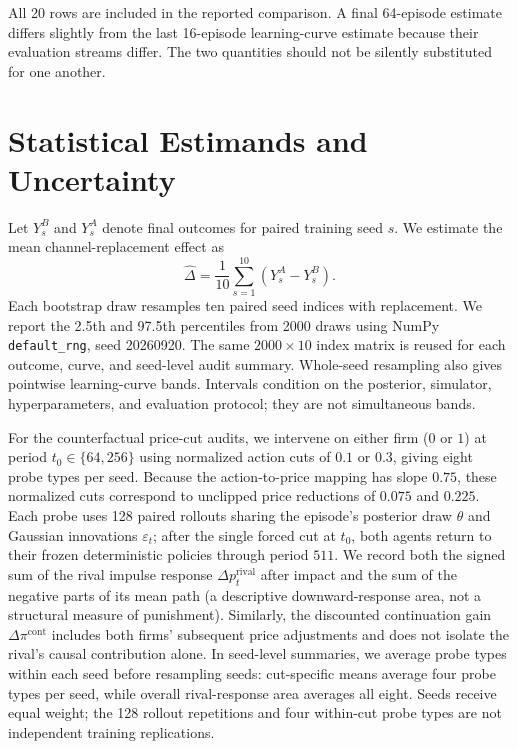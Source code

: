 \documentclass{article}
\begin{document}
All 20 rows are included in the reported comparison. A final 64-episode estimate differs slightly from the last 16-episode learning-curve estimate because their evaluation streams differ. The two quantities should not be silently substituted for one another.

\section{Statistical Estimands and Uncertainty}

Let $Y_s^B$ and $Y_s^A$ denote final outcomes for paired training seed $s$. We estimate the mean channel-replacement effect as
\[
\hat{\Delta} = \frac{1}{10}\sum_{s=1}^{10}(Y_s^A - Y_s^B).
\]
Each bootstrap draw resamples ten paired seed indices with replacement. We report the 2.5th and 97.5th percentiles from \num{2000} draws using NumPy \texttt{default\_rng}, seed 20260920. The same $2000\times10$ index matrix is reused for each outcome, curve, and seed-level audit summary. Whole-seed resampling also gives pointwise learning-curve bands. Intervals condition on the posterior, simulator, hyperparameters, and evaluation protocol; they are not simultaneous bands.

For the counterfactual price-cut audits, we intervene on either firm ($0$ or $1$) at period $t_0\in\{64, 256\}$ using normalized action cuts of $0.1$ or $0.3$, giving eight probe types per seed. Because the action-to-price mapping has slope $0.75$, these normalized cuts correspond to unclipped price reductions of $0.075$ and $0.225$. Each probe uses 128 paired rollouts sharing the episode's posterior draw $\theta$ and Gaussian innovations $\varepsilon_t$; after the single forced cut at $t_0$, both agents return to their frozen deterministic policies through period $511$. We record both the signed sum of the rival impulse response $\Delta p_t^{\mathrm{rival}}$ after impact and the sum of the negative parts of its mean path (a descriptive downward-response area, not a structural measure of punishment). Similarly, the discounted continuation gain $\Delta\pi^{\mathrm{cont}}$ includes both firms' subsequent price adjustments and does not isolate the rival's causal contribution alone. In seed-level summaries, we average probe types within each seed before resampling seeds: cut-specific means average four probe types per seed, while overall rival-response area averages all eight. Seeds receive equal weight; the 128 rollout repetitions and four within-cut probe types are not independent training replications.
\end{document}
